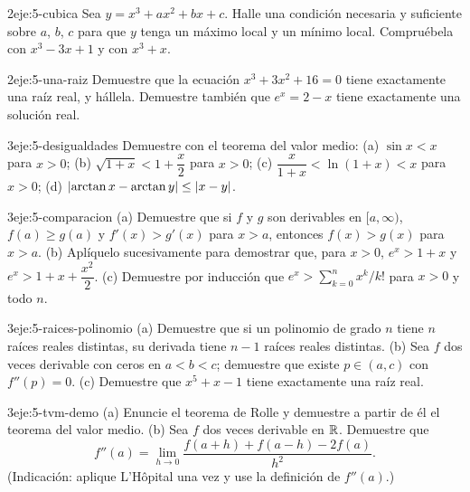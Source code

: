 \begin{ejercicio}{2}{eje:5-cubica}
Sea $y=x^{3}+ax^{2}+bx+c$. Halle una condición necesaria y suficiente sobre $a$, $b$, $c$ para que $y$ tenga un máximo local y un mínimo local. Compruébela con $x^{3}-3x+1$ y con $x^{3}+x$.
\end{ejercicio}

\begin{ejercicio}{2}{eje:5-una-raiz}
Demuestre que la ecuación $x^{3}+3x^{2}+16=0$ tiene exactamente una raíz real, y hállela. Demuestre también que $e^{x}=2-x$ tiene exactamente una solución real.
\end{ejercicio}

\begin{ejercicio}{3}{eje:5-desigualdades}
Demuestre con el teorema del valor medio: (a) $\sin x<x$ para $x>0$; (b) $\sqrt{1+x}<1+\dfrac x2$ para $x>0$; (c) $\dfrac{x}{1+x}<\ln(1+x)<x$ para $x>0$; (d) $\lvert\arctan x-\arctan y\rvert\le\lvert x-y\rvert$.
\end{ejercicio}

\begin{ejercicio}{3}{eje:5-comparacion}
(a) Demuestre que si $f$ y $g$ son derivables en $[a,\infty)$, $f(a)\ge g(a)$ y $f'(x)>g'(x)$ para $x>a$, entonces $f(x)>g(x)$ para $x>a$. (b) Aplíquelo sucesivamente para demostrar que, para $x>0$, $e^{x}>1+x$ y $e^{x}>1+x+\dfrac{x^{2}}{2}$. (c) Demuestre por inducción que $e^{x}>\sum_{k=0}^{n}x^{k}/k!$ para $x>0$ y todo $n$.
\end{ejercicio}

\begin{ejercicio}{3}{eje:5-raices-polinomio}
(a) Demuestre que si un polinomio de grado $n$ tiene $n$ raíces reales distintas, su derivada tiene $n-1$ raíces reales distintas. (b) Sea $f$ dos veces derivable con ceros en $a<b<c$; demuestre que existe $p\in(a,c)$ con $f''(p)=0$. (c) Demuestre que $x^{5}+x-1$ tiene exactamente una raíz real.
\end{ejercicio}

\begin{ejercicio}{3}{eje:5-tvm-demo}
(a) Enuncie el teorema de Rolle y demuestre a partir de él el teorema del valor medio. (b) Sea $f$ dos veces derivable en $\mathbb{R}$. Demuestre que
\[
f''(a)=\lim_{h\to0}\frac{f(a+h)+f(a-h)-2f(a)}{h^{2}}.
\]
(Indicación: aplique L'Hôpital una vez y use la definición de $f''(a)$.)
\end{ejercicio}

